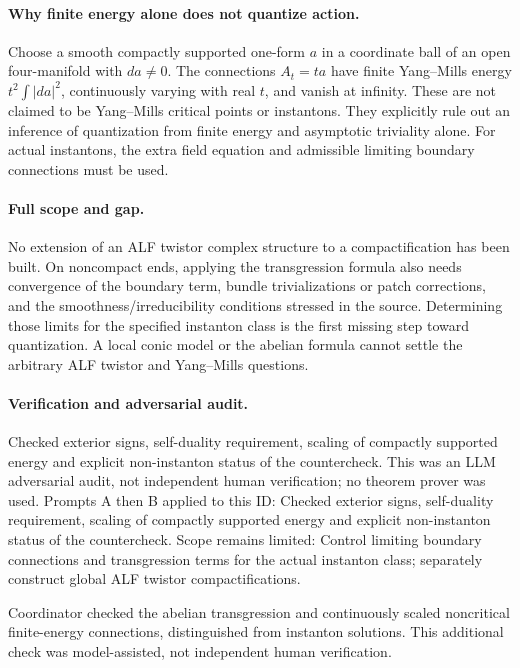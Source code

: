 \documentclass[11pt]{article}
\begin{document}
\paragraph{Why finite energy alone does not quantize action.}Choose a smooth compactly supported one-form \(a\) in a coordinate ball of an open four-manifold with \(da\ne0\). The connections \(A_t=ta\) have finite Yang--Mills energy \(t^2\int|da|^2\), continuously varying with real \(t\), and vanish at infinity. These are not claimed to be Yang--Mills critical points or instantons. They explicitly rule out an inference of quantization from finite energy and asymptotic triviality alone. For actual instantons, the extra field equation and admissible limiting boundary connections must be used.
\paragraph{Full scope and gap.}No extension of an ALF twistor complex structure to a compactification has been built. On noncompact ends, applying the transgression formula also needs convergence of the boundary term, bundle trivializations or patch corrections, and the smoothness/irreducibility conditions stressed in the source. Determining those limits for the specified instanton class is the first missing step toward quantization. A local conic model or the abelian formula cannot settle the arbitrary ALF twistor and Yang--Mills questions.

\paragraph{Verification and adversarial audit.}
Checked exterior signs, self-duality requirement, scaling of compactly supported energy and explicit non-instanton status of the countercheck. This was an LLM adversarial audit, not independent human verification; no theorem prover was used. Prompts A then B applied to this ID: Checked exterior signs, self-duality requirement, scaling of compactly supported energy and explicit non-instanton status of the countercheck. Scope remains limited: Control limiting boundary connections and transgression terms for the actual instanton class; separately construct global ALF twistor compactifications.

Coordinator checked the abelian transgression and continuously scaled noncritical finite-energy connections, distinguished from instanton solutions. This additional check was model-assisted, not independent human verification.
\end{document}
